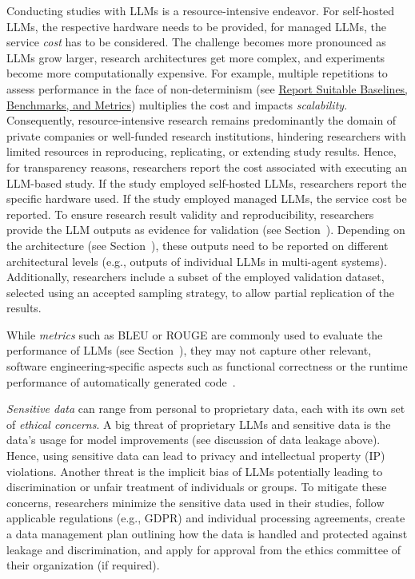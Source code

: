 Conducting studies with LLMs is a resource-intensive endeavor.
For self-hosted LLMs, the respective hardware needs to be provided, for managed LLMs, the service \emph{cost} has to be considered.
The challenge becomes more pronounced as LLMs grow larger, research architectures get more complex, and experiments become more computationally expensive.
For example, multiple repetitions to assess performance in the face of non-determinism (see \href{/guidelines/report-baselines-benchmarks-and-metrics}{Report Suitable Baselines, Benchmarks, and Metrics}) multiplies the cost and impacts \emph{scalability}.
Consequently, resource-intensive research remains predominantly the domain of private companies or well-funded research institutions, hindering researchers with limited resources in reproducing, replicating, or extending study results.
Hence, for transparency reasons, researchers \should report the cost associated with executing an LLM-based study. 
If the study employed self-hosted LLMs, researchers \should report the specific hardware used. 
If the study employed managed LLMs, the service cost \should be reported.
To ensure research result validity and reproducibility, researchers \must provide the LLM outputs as evidence for validation (see Section~\prompts).
Depending on the architecture (see Section~\toolarchitecture), these outputs need to be reported on different architectural levels (e.g., outputs of individual LLMs in multi-agent systems).
Additionally, researchers \should include a subset of the employed validation dataset, selected using an accepted sampling strategy, to allow partial replication of the results.

While \emph{metrics} such as BLEU or ROUGE are commonly used to evaluate the performance of LLMs (see Section~\benchmarksmetrics), they may not capture other relevant, software engineering-specific aspects such as functional correctness or the runtime performance of automatically generated code~\cite{DBLP:conf/nips/LiuXW023}.

\emph{Sensitive data} can range from personal to proprietary data, each with its own set of \emph{ethical concerns}.
A big threat of proprietary LLMs and sensitive data is the data's usage for model improvements (see discussion of data leakage above).
Hence, using sensitive data can lead to privacy and intellectual property (IP) violations.
Another threat is the implicit bias of LLMs potentially leading to discrimination or unfair treatment of individuals or groups.
To mitigate these concerns, researchers \should minimize the sensitive data used in their studies, \must follow applicable regulations (e.g., GDPR) and individual processing agreements, \should create a data management plan outlining how the data is handled and protected against leakage and discrimination, and \must apply for approval from the ethics committee of their organization (if required).

